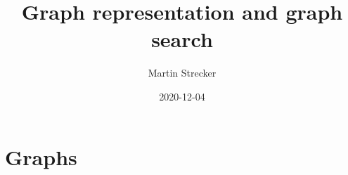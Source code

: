 \documentclass{beamer}
\title{Graph representation and graph search}
\author{Martin Strecker}
\date{2020-12-04}
\begin{document}

\begin{frame}
  \titlepage
\end{frame}



\section{Graphs}






\end{document}

